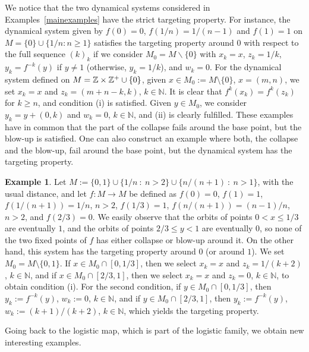 \documentclass[12pt,english]{amsart}
\numberwithin{equation}{section}
\theoremstyle{plain}
\theoremstyle{definition}
\newtheorem{example}[theorem]{Example}
\def\NN{\mathbb N}
\def\ZZ{\Bbb Z}
\begin{document}
We notice that the two dynamical systems considered in Examples~\ref{mainexamples} have the strict targeting property. For instance, the dynamical system given by $f(0)=0$, $f(1/n)=1/(n-1)$ and $f(1)=1$ on $M=\{0\}\cup\{1/n:n\ge 1\}$ satisfies the targeting property around $0$ with respect to the full sequence $(k)_k$ if we consider $M_0=M\backslash\{0\}$ with $x_k=x$, $z_k=1/k$, $y_k=f^{-k}(y)$ if $y\neq 1$ (otherwise, $y_k=1/k$), and  $w_k=0$. For the dynamical system  defined on $M=\ZZ\times\ZZ^+\cup\{0\}$, given $x\in M_0:=M\setminus \{0\}$, $x=(m,n)$, we set $x_k=x$ and $z_k=(m+n-k,k)$, $k\in\NN$. It is clear that $f^k(x_k)=f^k(z_k)$ for $k\geq n$, and condition (i) is satisfied. Given $y\in M_0$, we consider $y_k=y+(0,k)$ and $w_k=0$, $k\in\NN$, and (ii) is clearly fulfilled. These examples have in common that the part of the collapse fails around the base point, but the blow-up is satisfied. One can also construct an example where both, the collapse and the blow-up, fail around the base point, but the dynamical system has the targeting property. 

\begin{example}\label{exnoblow}
    Let $M:=\{0,1\}\cup\{1/n \ : \ n>2\}\cup \{n/(n+1) \ : \ n>1\}$, with the usual distance, and let $f:M\to M$ be defined as $f(0)=0$, $f(1)=1$, $f(1/(n+1))=1/n$, $n>2$, $f(1/3)=1$, $f(n/(n+1))=(n-1)/n$, $n>2$, and $f(2/3)=0$. We easily observe that the orbits of points $0<x\leq 1/3$ are eventually $1$, and the orbits of points $2/3\leq y<1$ are eventually $0$, so none of the two fixed points of $f$ has either collapse or blow-up around it. On the other hand, this system has the targeting property around $0$ (or around $1$). We set $M_0=M\setminus \{0,1\}$. If $x\in M_0\cap [0,1/3]$, then we select $x_k=x$ and $z_k=1/(k+2)$, $k\in\NN$, and if $x\in M_0\cap [2/3,1]$, then we select $x_k=x$ and $z_k=0$, $k\in\NN$, to obtain condition (i). For the second condition, if $y\in M_0\cap [0,1/3]$, then $y_k:=f^{-k}(y)$, $w_k:=0$, $k\in\NN$, and if $y\in M_0\cap [2/3,1]$, then $y_k:=f^{-k}(y)$, $w_k:=(k+1)/(k+2)$, $k\in\NN$, which yields the targeting property. 
\end{example}

Going back to the logistic map, which is part of the logistic family, we obtain new interesting examples. 
\end{document}
